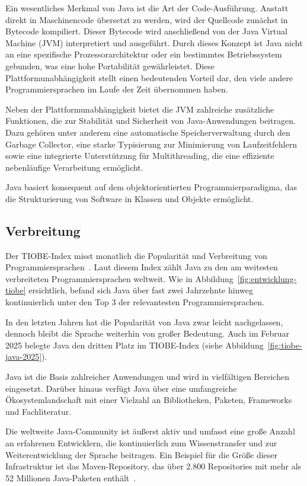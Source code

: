 \documentclass[11pt]{article}
\begin{document}
    Ein wesentliches Merkmal von Java ist die Art der Code-Ausführung.
    Anstatt direkt in Maschinencode übersetzt zu werden, wird der Quellcode zunächst in Bytecode kompiliert.
    Dieser Bytecode wird anschließend von der Java Virtual Machine (JVM) interpretiert und ausgeführt.
    Durch dieses Konzept ist Java nicht an eine spezifische Prozessorarchitektur oder ein
    bestimmtes Betriebssystem gebunden, was eine hohe Portabilität gewährleistet.
    Diese Plattformunabhängigkeit stellt einen bedeutenden Vorteil dar, den
    viele andere Programmiersprachen im Laufe der Zeit übernommen haben.

    Neben der Plattformunabhängigkeit bietet die JVM zahlreiche zusätzliche
    Funktionen, die zur Stabilität und Sicherheit von Java-Anwendungen beitragen.
    Dazu gehören unter anderem eine automatische Speicherverwaltung
    durch den Garbage Collector, eine starke Typisierung zur Minimierung
    von Laufzeitfehlern sowie eine integrierte Unterstützung für Multithreading,
    die eine effiziente nebenläufige Verarbeitung ermöglicht. \cite[51 - 54]{insel}

    Java basiert konsequent auf dem objektorientierten Programmierparadigma, das die Strukturierung von Software in Klassen und Objekte ermöglicht. \\

    \subsection{Verbreitung}
    Der TIOBE-Index misst monatlich die Popularität und Verbreitung von Programmiersprachen~\cite{tiobe}.
    Laut diesem Index zählt Java zu den am weitesten verbreiteten Programmiersprachen weltweit.
    Wie in Abbildung~\ref{fig:entwicklung-tiobe} ersichtlich, befand sich Java über fast zwei Jahrzehnte hinweg
    kontinuierlich unter den Top 3 der relevantesten Programmiersprachen.

    In den letzten Jahren hat die Popularität von Java zwar leicht nachgelassen, dennoch bleibt die Sprache weiterhin
    von großer Bedeutung.
    Auch im Februar 2025 belegte Java den dritten Platz im TIOBE-Index
    (siehe Abbildung~\ref{fig:tiobe-java-2025}).

    Java ist die Basis zahlreicher Anwendungen und wird in vielfältigen Bereichen eingesetzt.
    Darüber hinaus
    verfügt Java über eine umfangreiche Ökosystemlandschaft mit einer Vielzahl an Bibliotheken, Paketen,
    Frameworks und Fachliteratur.

    Die weltweite Java-Community ist äußerst aktiv und umfasst eine große Anzahl an erfahrenen Entwicklern,
    die kontinuierlich zum Wissenstransfer und zur Weiterentwicklung der Sprache beitragen.
    Ein Beispiel für die Größe dieser Infrastruktur ist das Maven-Repository, das über 2.800 Repositories mit mehr als 52 Millionen Java-Paketen
    enthält~\cite{maven}.
\end{document}
